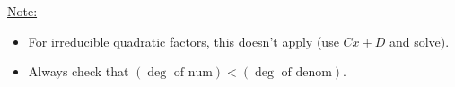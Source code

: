 \documentclass[12pt]{article}
\begin{document}
\vfill

\noindent\underline{Note:} 
\begin{itemize}
    \item For irreducible quadratic factors, this doesn't apply (use $Cx+D$ and solve).
    \item Always check that $(\deg \text{ of num}) < (\deg \text{ of denom})$.
\end{itemize}
\end{document}
